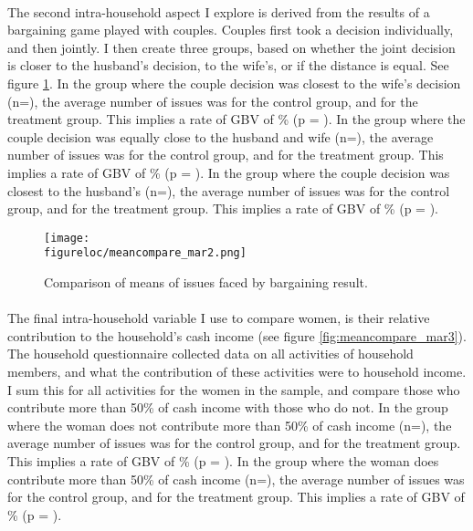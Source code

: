 \documentclass[11pt,a4paper]{scrartcl} %
\newcommand{\figureloc}{C:/Users/Koen/Dropbox/PhD/Papers/CongoGBV/Figures}
\begin{document}
\paragraph{}
The second intra-household aspect I explore is derived from the results of a bargaining game played with couples. Couples first took a decision individually, and then jointly. I then create three groups, based on whether the joint decision is closer to the husband's decision, to the wife's, or if the distance is equal. See figure \ref{fig:meancompare_mar2}. In the group where the couple decision was closest to the wife's decision (n=), the average number of issues was  for the control group, and  for the treatment group. This implies a rate of GBV of \% (p = ). In the group where the couple decision was equally close to the husband and wife (n=), the average number of issues was  for the control group, and  for the treatment group. This implies a rate of GBV of \% (p = ). In the group where the couple decision was closest to the husband's (n=), the average number of issues was  for the control group, and  for the treatment group. This implies a rate of GBV of \% (p = ).

\begin{figure}[H]
  \texttt{[image: \\figureloc/meancompare\_mar2.png]}
  \caption{Comparison of means of issues faced by bargaining result.}
  \label{fig:meancompare_mar2}
\end{figure}

\paragraph{}
The final intra-household variable I use to compare women, is their relative contribution to the household's cash income (see figure \ref{fig:meancompare_mar3}). The household questionnaire collected data on all activities of household members, and what the contribution of these activities were to household income. I sum this for all activities for the women in the sample, and compare those who contribute more than 50\% of cash income with those who do not. In the group where the woman does not contribute more than 50\% of cash income (n=), the average number of issues was  for the control group, and  for the treatment group. This implies a rate of GBV of \% (p = ). In the group where the woman does contribute more than 50\% of cash income (n=), the average number of issues was  for the control group, and  for the treatment group. This implies a rate of GBV of \% (p = ). 
\end{document}
